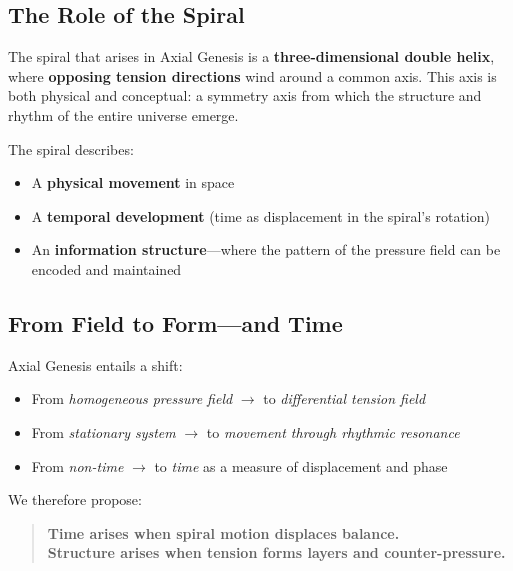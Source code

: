 \documentclass[a4paper,12pt]{article}
\begin{document}
\subsection{The Role of the Spiral}

The spiral that arises in Axial Genesis is a \textbf{three-dimensional double helix}, where \textbf{opposing tension directions} wind around a common axis. This axis is both physical and conceptual: a symmetry axis from which the structure and rhythm of the entire universe emerge.

The spiral describes:
\begin{itemize}
    \item A \textbf{physical movement} in space
    \item A \textbf{temporal development} (time as displacement in the spiral’s rotation)
    \item An \textbf{information structure}—where the pattern of the pressure field can be encoded and maintained
\end{itemize}

\subsection{From Field to Form—and Time}

Axial Genesis entails a shift:
\begin{itemize}
    \item From \textit{homogeneous pressure field} $\rightarrow$ to \textit{differential tension field}
    \item From \textit{stationary system} $\rightarrow$ to \textit{movement through rhythmic resonance}
    \item From \textit{non-time} $\rightarrow$ to \textit{time} as a measure of displacement and phase
\end{itemize}

We therefore propose:
\begin{quote}
    \textbf{Time arises when spiral motion displaces balance.} \\
    \textbf{Structure arises when tension forms layers and counter-pressure.}
\end{quote}
\end{document}
